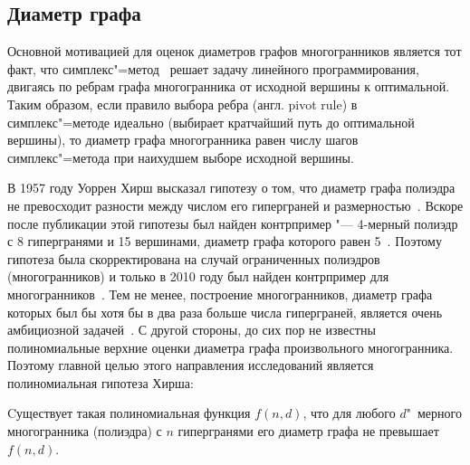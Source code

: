 

\subsection{Диаметр графа}
\label{sec:diameter}


Основной мотивацией для оценок диаметров графов многогранников является тот факт, что симплекс"=метод~\cite{Dantzig:1951} решает задачу линейного программирования, двигаясь по ребрам графа многогранника от исходной вершины к оптимальной.
Таким образом, если правило выбора ребра (англ. pivot rule) в симплекс"=методе идеально (выбирает кратчайший путь до оптимальной вершины), то диаметр графа многогранника равен числу шагов симплекс"=метода при наихудшем выборе исходной вершины.

В 1957 году Уоррен Хирш высказал гипотезу о том, что диаметр графа полиэдра не превосходит разности между числом его гиперграней и размерностью~\cite{Dantzig:1963}.
Вскоре после публикации этой гипотезы был найден контрпример "--- 4-мерный полиэдр с 8 гипергранями и 15 вершинами, диаметр графа которого равен 5~\cite{Klee:1967}.
Поэтому гипотеза была скорректирована на случай ограниченных полиэдров (многогранников) и только в 2010 году был найден контрпример для многогранников~\cite{Santos:2012}.
Тем не менее, построение многогранников, диаметр графа которых был бы хотя бы в два раза больше числа гиперграней, является очень амбициозной задачей~\cite{Santos:2013}.
С другой стороны, до сих пор не известны полиномиальные верхние оценки диаметра графа произвольного многогранника.
Поэтому главной целью этого направления исследований является полиномиальная гипотеза Хирша:

\begin{conjecture}
Cуществует такая полиномиальная функция $f(n, d)$,
что для любого $d$"~мерного многогранника (полиэдра)
с $n$ гипергранями его диаметр графа не превышает $f(n, d)$.
\end{conjecture}

